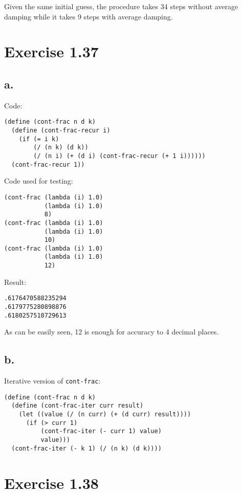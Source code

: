 \documentclass[../main.tex]{subfiles}
\begin{document}
Given the same initial guess, the procedure takes 34 steps without
 average damping while it takes 9 steps with average damping.

\section{Exercise 1.37}

\subsection*{a.}

Code:

\begin{lstlisting}
(define (cont-frac n d k)
  (define (cont-frac-recur i)
    (if (= i k)
        (/ (n k) (d k))
        (/ (n i) (+ (d i) (cont-frac-recur (+ 1 i))))))
  (cont-frac-recur 1))
\end{lstlisting}

Code used for testing:

\begin{lstlisting}
(cont-frac (lambda (i) 1.0)
           (lambda (i) 1.0)
           8)
(cont-frac (lambda (i) 1.0)
           (lambda (i) 1.0)
           10)
(cont-frac (lambda (i) 1.0)
           (lambda (i) 1.0)
           12)
\end{lstlisting}

Result:

\begin{lstlisting}
.6176470588235294
.6179775280898876
.6180257510729613
\end{lstlisting}

As can be easily seen, 12 is enough for accuracy to 4 decimal places.

\subsection*{b.}

Iterative version of \lstinline{cont-frac}:

\begin{lstlisting}
(define (cont-frac n d k)
  (define (cont-frac-iter curr result)
    (let ((value (/ (n curr) (+ (d curr) result))))
      (if (> curr 1)
          (cont-frac-iter (- curr 1) value)
          value)))
  (cont-frac-iter (- k 1) (/ (n k) (d k))))
\end{lstlisting}

\section{Exercise 1.38}
\end{document}

